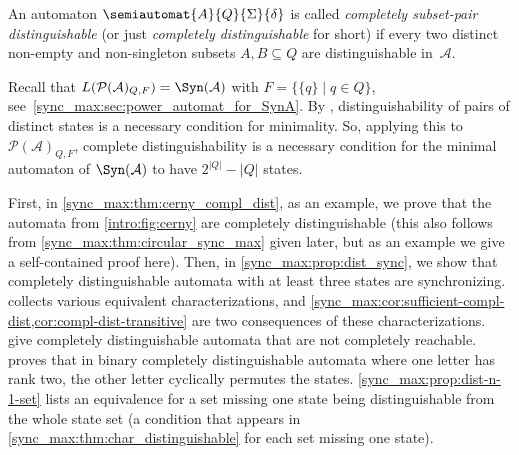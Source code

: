 
An automaton $\semiautomat{A}{Q}{\Sigma}{\delta}$ is called \emph{completely subset-pair distinguishable} (or just \emph{completely distinguishable} for short) 
if every two distinct non-empty and non-singleton subsets $A,B \subseteq Q$ are distinguishable in~$\mathcal A$.

Recall that $L(\mathcal P(\mathcal A)_{Q, F}) = \Syn(\mathcal A)$
with $F = \{\{q\} \mid q \in Q\}$, see~\cref{sync_max:sec:power_automat_for_SynA}. 
By ,
distinguishability of pairs of distinct states is a necessary condition 
for minimality.
So, applying this to $\mathcal P(\mathcal A)_{Q, F}$,
complete distinguishability
is a necessary condition for the minimal automaton
of $\Syn(\mathcal A)$ to have $2^{|Q|} - |Q|$ states.

First, in \cref{sync_max:thm:cerny_compl_dist}, as an example,
we prove that the \Cerny automata from \cref{intro:fig:cerny}
are completely distinguishable (this also follows from \cref{sync_max:thm:circular_sync_max} given later,
but as an example we give a self-contained proof here).
Then, in \cref{sync_max:prop:dist_sync},
we show that completely distinguishable automata
with at least three states are synchronizing.
 collects various equivalent characterizations,
and \cref{sync_max:cor:sufficient-compl-dist,cor:compl-dist-transitive}
are two consequences of these characterizations.
give completely distinguishable automata that are not completely reachable.
proves that in binary completely distinguishable automata where one letter has rank two,
the other letter cyclically permutes the states.
\cref{sync_max:prop:dist-n-1-set} lists an equivalence for a set missing one state being
distinguishable from the whole state set (a condition that appears in \cref{sync_max:thm:char_distinguishable}
for each set missing one state).

